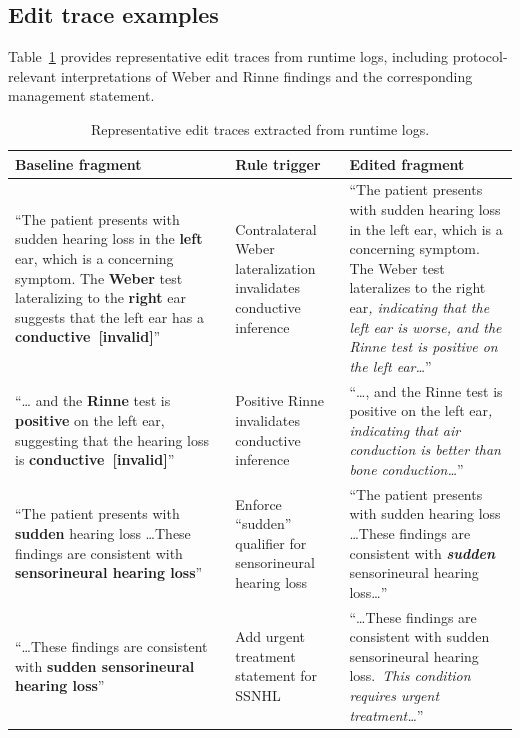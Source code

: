 \documentclass[twocolumn]{article}
\newcommand{\failmark}{[invalid]}
\begin{document}
\subsection{Edit trace examples}

Table~\ref{tab:edit-traces} provides representative edit traces from runtime
logs, including protocol-relevant interpretations of Weber and Rinne findings
and the corresponding management statement.

\begin{table}[!htbp]
  \centering
  \small
  \begin{tabular}{p{5cm} >{\raggedright\arraybackslash}p{4cm} p{5cm}}
    \toprule
    Baseline fragment & Rule trigger & Edited fragment \\
    \midrule

    ``The patient presents with sudden hearing loss in the \textbf{left} ear,
    which is a concerning symptom. The \textbf{Weber} test lateralizing to the
    \textbf{right} ear suggests that the left ear has a
    \textbf{conductive~\failmark}'' & Contralateral Weber lateralization
    invalidates conductive inference & ``The patient presents with sudden
    hearing loss in the left ear, which is a concerning symptom. The Weber test
    lateralizes to the right ear\emph{, indicating that the left ear is worse,
    and the Rinne test is positive on the left ear\ldots}'' \\

    \addlinespace

    ``\ldots{} and the \textbf{Rinne} test is \textbf{positive} on the left ear,
    suggesting that the hearing loss is \textbf{conductive~\failmark}'' & Positive
    Rinne invalidates conductive inference & ``\ldots{}, and the Rinne test is
    positive on the left ear\emph{, indicating that air conduction is better
    than bone conduction\ldots}'' \\

    \addlinespace

    ``The patient presents with \textbf{sudden} hearing loss \ldots These
    findings are consistent with \textbf{sensorineural hearing loss}'' & Enforce
    ``sudden'' qualifier for sensorineural hearing loss & ``The patient presents
    with sudden hearing loss \ldots These findings are consistent with
    \emph{\textbf{sudden}} sensorineural hearing loss\ldots{}'' \\

    \addlinespace

    ``\ldots{}These findings are consistent with \textbf{sudden sensorineural
    hearing loss}'' & Add urgent treatment statement for SSNHL & ``\ldots{}These
    findings are consistent with sudden sensorineural hearing loss.\ \emph{This
    condition requires urgent treatment\ldots{}}'' \\

    \bottomrule
  \end{tabular}

  \caption{ Representative edit traces extracted from runtime logs.
  }\label{tab:edit-traces}
\end{table}
\end{document}
